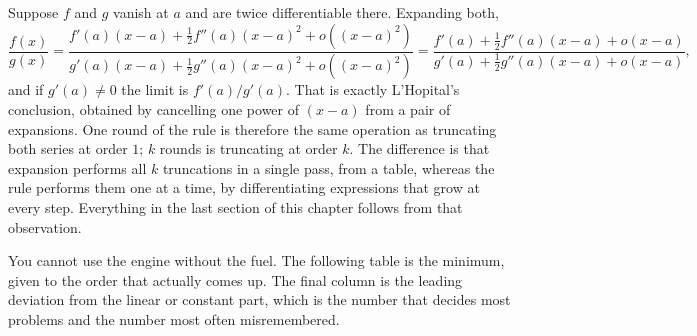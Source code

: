 \begin{keynote}
Suppose $f$ and $g$ vanish at $a$ and are twice differentiable there. Expanding both,
\[
\frac{f(x)}{g(x)}=\frac{f'(a)(x-a)+\tfrac12f''(a)(x-a)^{2}+o((x-a)^{2})}{g'(a)(x-a)+\tfrac12g''(a)(x-a)^{2}+o((x-a)^{2})}
=\frac{f'(a)+\tfrac12f''(a)(x-a)+o(x-a)}{g'(a)+\tfrac12g''(a)(x-a)+o(x-a)},
\]
and if $g'(a)\neq0$ the limit is $f'(a)/g'(a)$. That is exactly L'Hopital's conclusion, obtained by cancelling one power of $(x-a)$ from a pair of expansions. One round of the rule is therefore the same operation as truncating both series at order $1$; $k$ rounds is truncating at order $k$. The difference is that expansion performs all $k$ truncations in a single pass, from a table, whereas the rule performs them one at a time, by differentiating expressions that grow at every step. Everything in the last section of this chapter follows from that observation.
\end{keynote}

You cannot use the engine without the fuel. The following table is the minimum, given to the order that actually comes up. The final column is the leading deviation from the linear or constant part, which is the number that decides most problems and the number most often misremembered.

